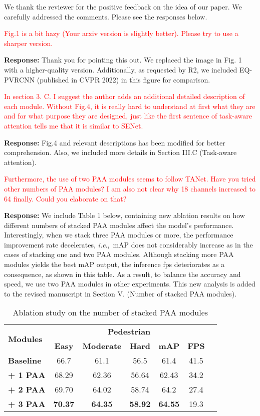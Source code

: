 \documentclass[11pt]{article}
\def\ie{\emph{i.e}.,~} \def\Ie{\emph{I.e}.,~}
\begin{document}
We thank the reviewer for the positive feedback on the idea of our paper. We carefully addressed the comments. Please see the responses below.

\textcolor{red}{Fig.1 is a bit hazy (Your arxiv version is slightly better). Please try to
use a sharper version.} 

\textbf{Response:} Thank you for pointing this out. We replaced the image in Fig. 1 with a higher-quality version. Additionally, as requested by R2, we included EQ-PVRCNN\cite{EQPVRCNN} (published in CVPR 2022) in this figure for comparison.

\textcolor{red}{In section 3. C. I suggest the author adds an additional detailed description of each module. Without Fig.4, it is really hard to understand at first what
they are and for what purpose they are designed, just like the first sentence
of task-aware attention tells me that it is similar to SENet.} 

\textbf{Response:} Fig.4 and relevant descriptions has been modified for better comprehension. Also, we included more details in Section III.C (Task-aware attention). 

\textcolor{red}{Furthermore, the use of two PAA modules seems to follow TANet. Have you tried other numbers of PAA modules? I am also not clear why 18 channels increased
to 64 finally. Could you elaborate on that?} 

\textbf{Response:} We include Table 1 below, containing new ablation results on how different numbers of stacked PAA modules affect the model's performance. Interestingly, when we stack three PAA modules or more, the performance improvement rate decelerates, \ie mAP does not considerably increase as in the cases of stacking one and two PAA modules. Although stacking more PAA modules yields the best mAP output, the inference fps deteriorates as a consequence, as shown in this table. As a result, to balance the accuracy and speed, we use two PAA modules in other experiments. This new analysis is added to the revised manuscript in Section V. (Number of stacked PAA modules).
\begin{table}[!h]\centering
\scriptsize
\begin{tabular}{lcccccc}\toprule
\multirow{2}{*}{\textbf{Modules}} &\multicolumn{5}{c}{\textbf{Pedestrian}} \\\cmidrule{2-6}
&\textbf{Easy} &\textbf{Moderate} &\textbf{Hard} &\textbf{mAP} &\textbf{FPS} \\\cmidrule{1-6}
\textbf{Baseline} &66.7 &61.1 &56.5 &61.4 &41.5 \\
\textbf{+ 1 PAA} &68.29 &62.36 &56.64 &62.43 &34.2 \\
\textbf{+ 2 PAA} &69.70 &64.02 &58.74 &64.2 &27.4 \\
\textbf{+ 3 PAA} &\textbf{70.37} &\textbf{64.35} &\textbf{58.92} &\textbf{64.55} &19.3 \\\cmidrule{1-6}
\end{tabular}
\caption{Ablation study on the number of stacked PAA modules}\label{tab:stackPAA_analysis}
\vspace{-2em}
\end{table} \vspace{+1em}
\end{document}
